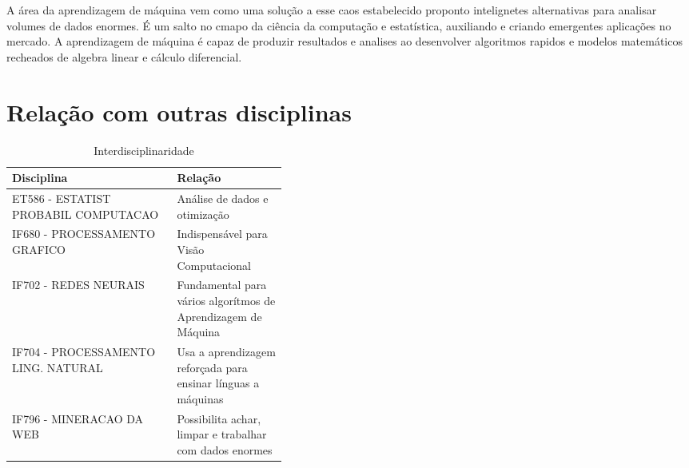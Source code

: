 \documentclass[10pt]{article}
\begin{document}
A área da aprendizagem de máquina vem como uma solução a esse caos estabelecido proponto intelignetes alternativas para analisar volumes de dados enormes. É um salto no cmapo da ciência da computação e estatística, auxiliando e criando emergentes aplicações no mercado. A aprendizagem de máquina é capaz de produzir resultados e analises ao desenvolver algoritmos rapidos e modelos matemáticos recheados de algebra linear e cálculo diferencial.
\cite{george2016learning}

\section{Relação com outras disciplinas}

\begin{table}[h!]
  \begin{center}
    \caption{Interdisciplinaridade \cite{yaser2012learning}}
    \label{tab:table1}
     \begin{tabular}{|l|p{0.4\linewidth}|}
      \textbf{Disciplina} & \textbf{Relação}\\
      \hline
       ET586 - ESTATIST PROBABIL COMPUTACAO & Análise de dados e otimização\newline\hline  \\
       IF680 - PROCESSAMENTO GRAFICO  & Indispensável para Visão  Computacional \hline\\
       IF702 - REDES NEURAIS & Fundamental para vários algorítmos de Aprendizagem de Máquina \hline \\
       IF704 - PROCESSAMENTO LING. NATURAL & Usa a aprendizagem reforçada para ensinar línguas a máquinas \hline \\
       IF796 - MINERACAO DA WEB & Possibilita achar, limpar e trabalhar com dados enormes
    \end{tabular}
  \end{center}
\end{table}




\end{document}

